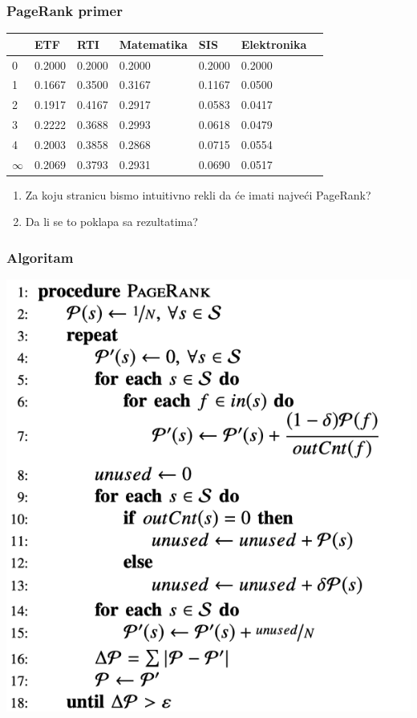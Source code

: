 \documentclass[11pt]{beamer}
\begin{document}
\begin{frame}
    \frametitle{PageRank primer}
  		\begin{center}
\begin{table}[]
\centering
\begin{tabular}{|l|l|l|l|l|l|l|}
\hline
    & ETF & RTI & Matematika  & SIS & Elektronika  \\ \hline
0   & 0.2000  & 0.2000 &  0.2000  & 0.2000  &  0.2000   \\ \hline
1   & 0.1667  & 0.3500 &  0.3167  & 0.1167  &  0.0500   \\ \hline
2   & 0.1917  & 0.4167 &  0.2917  & 0.0583  &  0.0417   \\ \hline
3   & 0.2222  & 0.3688 &  0.2993  & 0.0618  &  0.0479   \\ \hline
4   & 0.2003  & 0.3858 &  0.2868  & 0.0715  &  0.0554  \\ \hline
$\infty$   & 0.2069  & 0.3793 &  0.2931  & 0.0690  &  0.0517 \\ \hline
\end{tabular}
\end{table}
    \begin{enumerate}
        \item Za koju stranicu bismo intuitivno rekli da će imati najveći PageRank?
        \item Da li se to poklapa sa rezultatima?
    \end{enumerate}
        \end{center}
\end{frame}

\begin{frame}
\frametitle{Algoritam}
\begin{center}
   \includegraphics[width=0.6\columnwidth]{algoritam.png}
\end{center}
\end{frame}
\end{document}
